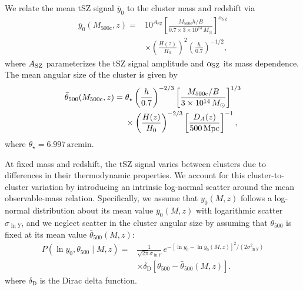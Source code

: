 \documentclass[aps,prd,twocolumn,superscriptaddress,nofootinbib,floatfix]{revtex4-2}
\begin{document}
We relate the mean tSZ signal $\bar{y}_0$ to the cluster mass and redshift via
\begin{equation}
\begin{aligned}
\bar{y}_0(M_{500\mathrm{c}},z)
={}&
10^{A_{\mathrm{SZ}}}
\left[
    \frac{M_{500\mathrm{c}}h/B}
    {0.7\times 3\times 10^{14}\,M_\odot}
\right]^{\alpha_{\mathrm{SZ}}}
\\
&\times
\left(\frac{H(z)}{H_0}\right)^2
\left(\frac{h}{0.7}\right)^{-1/2},
\end{aligned}
\label{eq:y0_scaling_relation}
\end{equation}
where $A_{\rm SZ}$ parameterizes the tSZ signal amplitude and $\alpha_{\rm SZ}$ its mass dependence. The mean angular size of the cluster is given by 
\begin{equation}
\begin{aligned}
\bar{\theta}_{500}(M_{500\mathrm{c}},z)
={}&
\theta_\star
\left(\frac{h}{0.7}\right)^{-2/3}
\left[
    \frac{M_{500\mathrm{c}}/B}{3\times10^{14}\,M_\odot}
\right]^{1/3}
\\
&\times
\left(\frac{H(z)}{H_0}\right)^{-2/3}
\left[\frac{D_A(z)}{500\,{\rm Mpc}}\right]^{-1},
\end{aligned}
\label{eq:theta500_scaling_relation}
\end{equation}
where $\theta_\star = 6.997\,\mathrm{arcmin}$.

At fixed mass and redshift, the tSZ signal varies between clusters due to differences in their thermodynamic properties. We account for this cluster-to-cluster variation by introducing an intrinsic log-normal scatter around the mean observable-mass relation. Specifically, we assume that $y_0(M,z)$ follows a log-normal distribution about its mean value $\bar{y}_0(M,z)$ with logarithmic scatter $\sigma_{\ln Y}$, and we neglect scatter in the cluster angular size by assuming that $\theta_{500}$ is fixed at its mean value $\bar{\theta}_{500}(M,z)$:
\begin{equation}
\begin{aligned}
P\!\left(\ln y_0,\theta_{500}\mid M,z\right)
={}&
\frac{1}{\sqrt{2\pi}\sigma_{\ln Y}}\,
e^{-\left[\ln y_0-\ln \bar{y}_0(M,z)\right]^2/
\left(2\sigma_{\ln Y}^{2}\right)}
\\
&\times
\delta_{\mathrm D}\!\left[
\theta_{500}-\bar{\theta}_{500}(M,z)
\right].
\end{aligned}
\label{eq:intrinsic_observable_distribution}
\end{equation}
where $\delta_{\mathrm{D}}$ is the Dirac delta function. 
\end{document}
